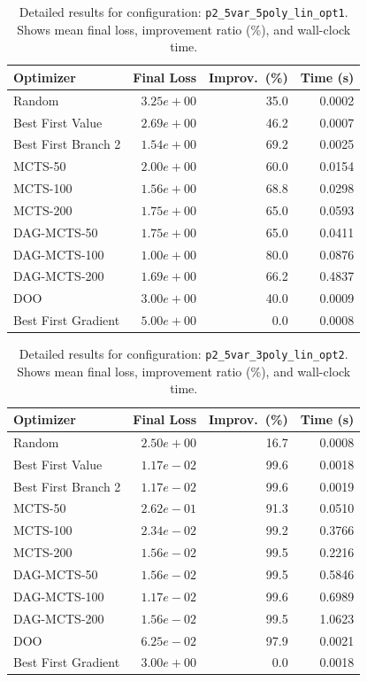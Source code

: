 \begin{table}[H]
\centering
\caption{Detailed results for configuration: \texttt{p2\_5var\_5poly\_lin\_opt1}. Shows mean final loss, improvement ratio (\%), and wall-clock time.}
\label{tab:abssum-detail-10}
\begin{tabular}{lrrr}
\toprule
Optimizer & Final Loss & Improv.~(\%) & Time (s) \\
\midrule
Random & $3.25e+00$ & 35.0 & 0.0002 \\
\hline
Best First Value & $2.69e+00$ & 46.2 & 0.0007 \\
\hline
Best First Branch 2 & $1.54e+00$ & 69.2 & 0.0025 \\
\hline
MCTS-50 & $2.00e+00$ & 60.0 & 0.0154 \\
\hline
MCTS-100 & $1.56e+00$ & 68.8 & 0.0298 \\
\hline
MCTS-200 & $1.75e+00$ & 65.0 & 0.0593 \\
\hline
DAG-MCTS-50 & $1.75e+00$ & 65.0 & 0.0411 \\
\hline
DAG-MCTS-100 & \textbf{$1.00e+00$} & 80.0 & 0.0876 \\
\hline
DAG-MCTS-200 & $1.69e+00$ & 66.2 & 0.4837 \\
\hline
DOO & $3.00e+00$ & 40.0 & 0.0009 \\
\hline
Best First Gradient & $5.00e+00$ & 0.0 & 0.0008 \\
\bottomrule
\end{tabular}
\end{table}

\begin{table}[H]
\centering
\caption{Detailed results for configuration: \texttt{p2\_5var\_3poly\_lin\_opt2}. Shows mean final loss, improvement ratio (\%), and wall-clock time.}
\label{tab:abssum-detail-11}
\begin{tabular}{lrrr}
\toprule
Optimizer & Final Loss & Improv.~(\%) & Time (s) \\
\midrule
Random & $2.50e+00$ & 16.7 & 0.0008 \\
\hline
Best First Value & \textbf{$1.17e-02$} & 99.6 & 0.0018 \\
\hline
Best First Branch 2 & \textbf{$1.17e-02$} & 99.6 & 0.0019 \\
\hline
MCTS-50 & $2.62e-01$ & 91.3 & 0.0510 \\
\hline
MCTS-100 & $2.34e-02$ & 99.2 & 0.3766 \\
\hline
MCTS-200 & $1.56e-02$ & 99.5 & 0.2216 \\
\hline
DAG-MCTS-50 & $1.56e-02$ & 99.5 & 0.5846 \\
\hline
DAG-MCTS-100 & \textbf{$1.17e-02$} & 99.6 & 0.6989 \\
\hline
DAG-MCTS-200 & $1.56e-02$ & 99.5 & 1.0623 \\
\hline
DOO & $6.25e-02$ & 97.9 & 0.0021 \\
\hline
Best First Gradient & $3.00e+00$ & 0.0 & 0.0018 \\
\bottomrule
\end{tabular}
\end{table}

